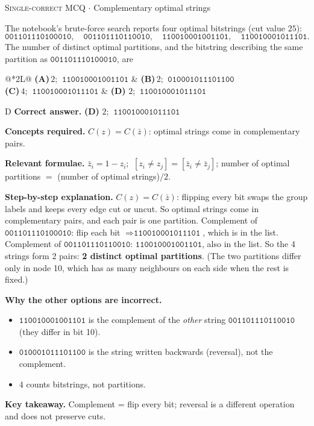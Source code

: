 \documentclass[11pt,a4paper]{article}
\newcommand{\optlabel}[1]{\textbf{(#1)}}
\newcommand{\correctlabel}[1]{\textcolor{okgreen}{\textbf{(#1)}\,\ding{51}}}
\newenvironment{qitem}[1]{\begin{list}{}{\setlength{\leftmargin}{3.3em}\setlength{\labelwidth}{3.1em}%
  \setlength{\labelsep}{0.2em}\setlength{\topsep}{3pt}\setlength{\parsep}{3pt}}\item[\textbf{Q.#1}\hfill]}{\end{list}}
\newcommand{\qsep}{\par\vspace{2pt}{\color{black!15}\hrule}\vspace{4pt}}
\newcommand{\qmeta}[2]{{\footnotesize\color{black!60}\textsc{#1} \;$\cdot$\; #2}\par}
\begin{document}
\begin{qitem}{14}
\qmeta{Single-correct MCQ}{Complementary optimal strings}
The notebook's brute-force search reports four optimal bitstrings (cut value $25$):
\[ \texttt{001101110100010},\quad \texttt{001101110110010},\quad \texttt{110010001001101},\quad \texttt{110010001011101}. \]
The number of distinct optimal partitions, and the bitstring describing the same partition as $\texttt{001101110100010}$, are
\par\smallskip\noindent\begin{tabularx}{\linewidth}{@{}*{2}{L}@{}}
\optlabel{A}\,$2$; $\ \texttt{110010001001101}$ & \optlabel{B}\,$2$; $\ \texttt{010001011101100}$ \\[3pt]
\optlabel{C}\,$4$; $\ \texttt{110010001011101}$ & \correctlabel{D}\,$2$; $\ \texttt{110010001011101}$
\end{tabularx}
\end{qitem}
\begin{solbox}{D}
\textbf{\color{brand}Correct answer.} \textcolor{okgreen}{\textbf{(D)}} $2$; $\ \texttt{110010001011101}$

\textbf{\color{brand}Concepts required.} $C(z) = C(\bar z)$: optimal strings come in complementary pairs.

\textbf{\color{brand}Relevant formulae.} $\bar z_i = 1 - z_i$; $\ [z_i\neq z_j] = [\bar z_i\neq\bar z_j]$; number of optimal partitions $=$ (number of optimal strings)$/2$.

\textbf{\color{brand}Step-by-step explanation.} $C(z) = C(\bar z)$: flipping every bit swaps the group labels and keeps every edge cut or uncut. So optimal strings
come in complementary pairs, and each pair is one partition.
Complement of $\texttt{001101110100010}$: flip each bit $\Rightarrow \texttt{110010001011101}$, which is in the list.
Complement of $\texttt{001101110110010}$: $\texttt{110010001001101}$, also in the list.
So the 4 strings form 2 pairs: \textbf{2 distinct optimal partitions}. (The two partitions differ only in node 10,
which has as many neighbours on each side when the rest is fixed.)

\textbf{\color{brand}Why the other options are incorrect.}
\begin{itemize}[leftmargin=2.4em, itemsep=1pt, topsep=2pt]
\item[\textbf{(A)}] $\texttt{110010001001101}$ is the complement of the \emph{other} string $\texttt{001101110110010}$ (they differ in bit 10).
\item[\textbf{(B)}] $\texttt{010001011101100}$ is the string written backwards (reversal), not the complement.
\item[\textbf{(C)}] $4$ counts bitstrings, not partitions.
\end{itemize}
\textbf{\color{brand}Key takeaway.} Complement = flip every bit; reversal is a different operation and does not preserve cuts.
\end{solbox}
\qsep
\end{document}
